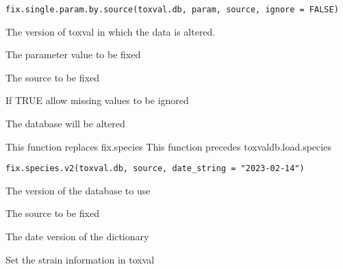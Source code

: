 \documentclass[letterpaper]{book}
\begin{document}
%
\begin{Usage}
\begin{verbatim}
fix.single.param.by.source(toxval.db, param, source, ignore = FALSE)
\end{verbatim}
\end{Usage}
%
\begin{Arguments}
\begin{ldescription}
\item[\code{toxval.db}] The version of toxval in which the data is altered.

\item[\code{param}] The parameter value to be fixed

\item[\code{source}] The source to be fixed

\item[\code{ignore}] If TRUE allow missing values to be ignored
\end{ldescription}
\end{Arguments}
%
\begin{Value}
The database will be altered
\end{Value}
%
\begin{Description}\relax
This function replaces fix.species
This function precedes toxvaldb.load.species
\end{Description}
%
\begin{Usage}
\begin{verbatim}
fix.species.v2(toxval.db, source, date_string = "2023-02-14")
\end{verbatim}
\end{Usage}
%
\begin{Arguments}
\begin{ldescription}
\item[\code{toxval.db}] The version of the database to use

\item[\code{source}] The source to be fixed

\item[\code{date\_string}] The date version of the dictionary
\end{ldescription}
\end{Arguments}
%
\begin{Description}\relax
Set the strain information in toxval
\end{Description}
\end{document}
